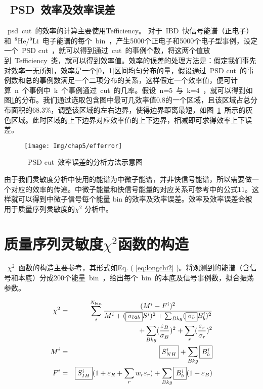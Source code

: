 \subsection{~PSD~效率及效率误差}
~psd~cut~的效率的计算主要使用Tefficiency\citep{TEfficiency}。 对于~IBD~快信号能谱（正电子）和~$^{8}$He/$^{9}$Li~电子能谱的每个~bin~，产生5000个正电子和5000个电子型事例，设定一个~PSD cut~，就可以得到通过~cut~的事例个数，将这两个值放到~Tefficiency~类，就可以得到效率值。效率的误差的处理方法是：假定我们事先对效率一无所知，效率是一个[0，1]区间均匀分布的量，假设通过~PSD cut~的事例数和总的事例数满足一个二项分布的关系，这样假定一个效率值，便可计算~n~个事例中~k~个事例通过~cut~的几率。假设~n=5~与~k=4~，就可以得到如图\ref{fig:efferror}的分布。我们通过选取包含图中最可几效率值0.8的一个区域，且该区域占总分布面积的68.3\%，调整该区域的左右边界，使得边界距离最短，如图~\ref{fig:efferror}~所示的灰色区域。此时区域的上下边界对应效率值的上下边界，相减即可求得效率上下误差。
\begin{figure}[!htbp]
  \centering
   \texttt{[image: Img/chap5/efferror]}
    \caption{~PSD cut~效率误差的分析方法示意图}
  \label{fig:efferror}
\end{figure}
由于我们灵敏度分析中使用的能谱为中微子能谱，并非快信号能谱，所以需要做一个对应的效率的传递。中微子能量和快信号能量的对应关系可参考\citep{vogel1999angular}中的公式11。这样就可以得到中微子信号每个能量 bin 的效率及效率误差。效率及效率误差会被用于质量序列灵敏度的$\chi^2$ 分析中。
\section{质量序列灵敏度$\chi^2$函数的构造}
~$\chi^2$~函数的构造主要参考\citep{li2013unambiguous}，其形式如Eq. ( \ref{eq:longchi2} )。将观测到的能谱（含信号和本底）分成200个能量~bin~，给出每个~bin~的本底及信号事例数，拟合振荡参数。

\begin{eqnarray}
\label{eq:longchi2}
 \chi^{2} &=&
    \sum_i^{N_{bin}}  \frac{(M^{i}-F^{i})^2}{M^{i}+( {\fbox{$ \sigma_{b2b} $}} S^i)^{2}+\sum_{Bkg}( {\fbox{$ \sigma_{b}$}} B^i_b)^2}  \nonumber \\
       && +\sum_{Bkg}(\frac{\varepsilon_B}{\sigma_B})^2
        +\sum_r(\frac{\varepsilon_r}{\sigma_r})^2 \nonumber \\
          M^i &=& {\fbox{$ S^i_{NH} $}}+\sum_{Bkg}{\fbox {$ B^i_b $} } \nonumber  \\
      F^i &=& {\fbox{$ S^i_{IH}$}}(1+\varepsilon_R+\sum_{r}w_r\varepsilon_{r})+\sum_{Bkg}{\fbox {$B^i_b$}}(1+\varepsilon_B)
\end{eqnarray}

